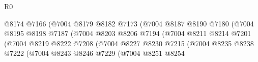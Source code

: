 \begin{lexlean}{R0}
\begin{coremodule}
                                                @8174
                                                @7166
                                                (@7004
                                                  @8179
                                                  @8182
                                                  @7173
                                                  (@7004
                                                    @8187
                                                    @8190
                                                    @7180
                                                    (@7004
                                                      @8195
                                                      @8198
                                                      @7187
                                                      (@7004
                                                        @8203
                                                        @8206
                                                        @7194
                                                        (@7004
                                                          @8211
                                                          @8214
                                                          @7201
                                                          (@7004
                                                            @8219
                                                            @8222
                                                            @7208
                                                            (@7004
                                                              @8227
                                                              @8230
                                                              @7215
                                                              (@7004
                                                                @8235
                                                                @8238
                                                                @7222
                                                                (@7004
                                                                  @8243
                                                                  @8246
                                                                  @7229
                                                                  (@7004
                                                                    @8251
                                                                    @8254

\end{coremodule}
\end{lexlean}
